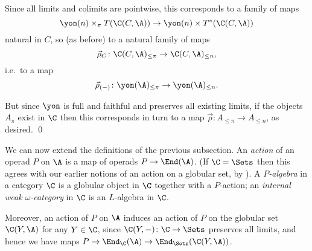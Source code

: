 Since all limits and colimits are pointwise, this corresponds to a
family of maps 
\[\yon(n) \times_{\pi} T (\C(C,\A)) \to \yon(n) \times T^*(\C(C,\A))\]
natural in $C$, so (as before) to a natural family of maps
\[\vec \rho_C\colon  \C(C,\A)_{\leq \pi} \to \C(C,\A)_{\leq n},\]
i.e.\ to a map
\[\vec \rho_{(-)}\colon  \yon(\A)_{\leq \pi} \to \yon(\A)_{\leq n}.\]

But since $\yon$ is full and faithful and preserves all existing limits, if the objects $A_\pi$ exist in $\C$ then this corresponds in turn to a map $\vec \rho\colon  A_{\leq \pi} \to A_{\leq n}$, as desired. \qed


We can now extend the definitions of the previous subsection.  An \emph{action} of an operad $P$ on $\A$ is a map of operads $P \to \End(\A)$. (If $\C = \Sets$ then this agrees with our earlier notions of an action on a globular set, by \cite[6.4]{leinster:book}).  A \emph{$P$-algebra} in a category $\C$ is a globular object in $\C$ together with a $P$-action; an \emph{internal weak $\omega$-category} in $\C$ is an $L$-algebra in $\C$.

Moreover, an action of $P$ on $\A$ induces an action of $P$ on the globular set $\C(Y,\A)$ for any $Y \in \C$, since $\C(Y, - ) \colon  \C \to \Sets$ preserves all limits, and hence we have maps $P \to \End_\C(\A) \to \End_\Sets(\C(Y,\A))$.

